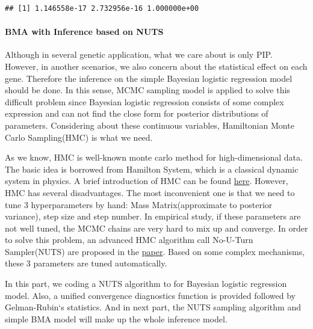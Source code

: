 \documentclass[
]{article}
\newenvironment{Shaded}{\begin{snugshade}}{\end{snugshade}}
\newcommand{\DecValTok}[1]{\textcolor[rgb]{0.00,0.00,0.81}{#1}}
\newcommand{\KeywordTok}[1]{\textcolor[rgb]{0.13,0.29,0.53}{\textbf{#1}}}
\newcommand{\NormalTok}[1]{#1}
\newcommand{\OperatorTok}[1]{\textcolor[rgb]{0.81,0.36,0.00}{\textbf{#1}}}
\begin{document}
\begin{Shaded}
\begin{Highlighting}[]
{\KeywordTok{BMA_simple}\NormalTok{(X, Y, }\KeywordTok{rep}\NormalTok{(}\DecValTok{1}\OperatorTok{/}\KeywordTok{ncol}\NormalTok{(X), }\KeywordTok{ncol}\NormalTok{(X)), mu0, sigma0, lower, higher)}
\end{Highlighting}
\end{Shaded}

\begin{verbatim}
## [1] 1.146558e-17 2.732956e-16 1.000000e+00
\end{verbatim}

\hypertarget{bma-with-inference-based-on-nuts}{%
\paragraph{BMA with Inference based on
NUTS}\label{bma-with-inference-based-on-nuts}}

Although in several genetic application, what we care about is only PIP.
However, in another scenarios, we also concern about the statistical
effect on each gene. Therefore the inference on the simple Bayesian
logistic regression model should be done. In this sense, MCMC sampling
model is applied to solve this difficult problem since Bayesian logistic
regression consists of some complex expression and can not find the
close form for posterior distributions of parameters. Considering about
these continuous variables, Hamiltonian Monte Carlo Sampling(HMC) is
what we need.

As we know, HMC is well-known monte carlo method for high-dimensional
data. The basic idea is borrowed from Hamilton System, which is a
classical dynamic system in physics. A brief introduction of HMC can be
found
\href{https://en.wikipedia.org/wiki/Hamiltonian_Monte_Carlo}{here}.
However, HMC has several disadvantages. The most inconvenient one is
that we need to tune 3 hyperparameters by hand: Mass Matrix(approximate
to posterior variance), step size and step number. In empirical study,
if these parameters are not well tuned, the MCMC chains are very hard to
mix up and converge. In order to solve this problem, an advanced HMC
algorithm call No-U-Turn Sampler(NUTS) are proposed in the
\href{https://arxiv.org/abs/1111.4246}{paper}. Based on some complex
mechanisms, these 3 parameters are tuned automatically.

In this part, we coding a NUTS algorithm to for Bayesian logistic
regression model. Also, a unified convergence diagnostics function is
provided followed by Gelman-Rubin`s statistics. And in next part, the
NUTS sampling algorithm and simple BMA model will make up the whole
inference model.
\end{document}
